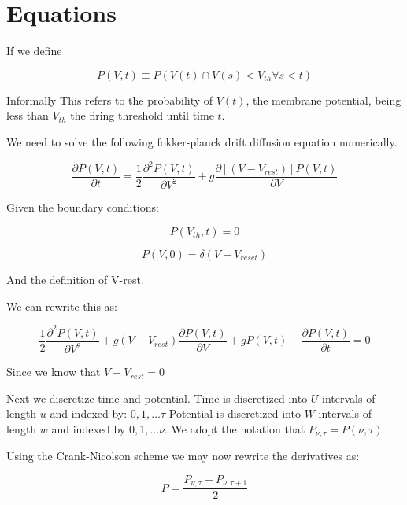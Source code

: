 \documentclass[10pt]{article}
\begin{document}
 

\section{Equations}

If we define

\begin{equation}
    P(V,t) \equiv P(V(t) \cap  V(s) < V_{th} \forall s < t)
\end{equation}

Informally This refers to the probability of $V(t)$, the membrane potential,
being less than $V_{th}$ the firing threshold until time $t$.  


We need to solve the following fokker-planck drift diffusion equation
numerically.

\begin{equation}
    \frac{\partial P(V,t)}{\partial t} =
    \frac{1}{2} \frac{\partial^2 P(V,t) } {\partial V^2} +
    g\frac{\partial[(V-V_{rest})]P(V,t)}{\partial V}
\end{equation}

Given the boundary conditions:

\begin{equation}
    P(V_{th},t) = 0
\end{equation}

\begin{equation}
    P(V,0) = \delta(V-V_{reset})
\end{equation}

And the definition of V-rest.


We can rewrite this as:

\begin{equation}
    \frac{1}{2} \frac{\partial^2 P(V,t) } {\partial V^2} +
    g(V-V_{rest})\frac{\partial P(V,t)}{\partial V} +
    gP(V,t) -
    \frac{\partial P(V,t)}{\partial t} = 
    0
\end{equation}

Since we know that $ V-V_{rest} = 0 $

Next we discretize time and potential. Time is discretized  into $U$
intervals of length $u$ and indexed by: $ 0,1, \dots \tau $ Potential
is discretized into $W$ intervals of length $w$ and indexed by $ 0,1,
\dots \nu $. We adopt the notation that $P_{\nu,\tau} = P(\nu,\tau)$ 

Using the Crank-Nicolson scheme we  may now rewrite the derivatives as:

\begin{equation}
    P = \frac{P_{\nu,\tau} + P_{\nu,\tau + 1}}{2}
\end{equation}
\end{document}
